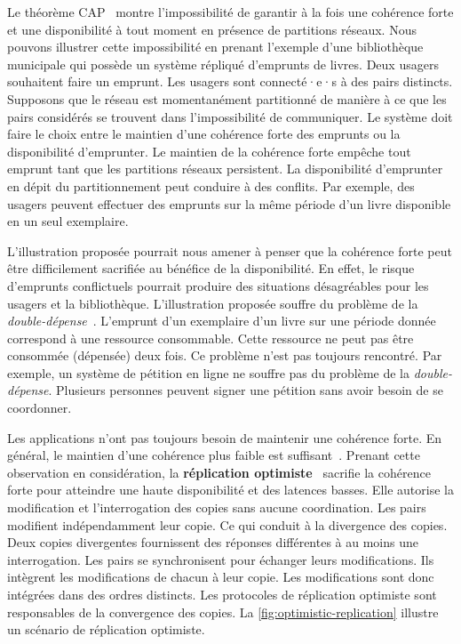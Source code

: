 Le théorème CAP~\cite{brewer_cap_2000,gilbert_cap_2002} montre l'impossibilité de garantir à la fois une cohérence forte et une disponibilité à tout moment en présence de partitions réseaux.
Nous pouvons illustrer cette impossibilité en prenant l'exemple d'une bibliothèque municipale qui possède un système répliqué d'emprunts de livres.
Deux usagers souhaitent faire un emprunt.
Les usagers sont connecté·e·s à des pairs distincts.
Supposons que le réseau est momentanément partitionné de manière à ce que les pairs considérés se trouvent dans l'impossibilité de communiquer.
Le système doit faire le choix entre le maintien d'une cohérence forte des emprunts ou la disponibilité d'emprunter.
Le maintien de la cohérence forte empêche tout emprunt tant que les partitions réseaux persistent.
La disponibilité d'emprunter en dépit du partitionnement peut conduire à des conflits.
Par exemple, des usagers peuvent effectuer des emprunts sur la même période d'un livre disponible en un seul exemplaire.

L'illustration proposée pourrait nous amener à penser que la cohérence forte peut être difficilement sacrifiée au bénéfice de la disponibilité.
En effet, le risque d'emprunts conflictuels pourrait produire des situations désagréables pour les usagers et la bibliothèque.
L'illustration proposée souffre du problème de la \emph{double-dépense}~\cite{chohan_doublespending_2017}.
L'emprunt d'un exemplaire d'un livre sur une période donnée correspond à une ressource consommable.
Cette ressource ne peut pas être consommée (dépensée) deux fois.
Ce problème n'est pas toujours rencontré.
Par exemple, un système de pétition en ligne ne souffre pas du problème de la \emph{double-dépense}.
Plusieurs personnes peuvent signer une pétition sans avoir besoin de se coordonner.

Les applications n'ont pas toujours besoin de maintenir une cohérence forte.
En général, le maintien d'une cohérence plus faible est suffisant~\autocite{terry_baseball_2013, hellerstein_calm_2019, decandia_dynamo_2007}.
Prenant cette observation en considération, la \textbf{réplication optimiste}~\autocite{saito_2005_optimisticreplication} sacrifie la cohérence forte pour atteindre une haute disponibilité et des latences basses.
Elle autorise la modification et l'interrogation des copies sans aucune coordination.
Les pairs modifient indépendamment leur copie.
Ce qui conduit à la divergence des copies.
Deux copies divergentes fournissent des réponses différentes à au moins une interrogation.
Les pairs se synchronisent pour échanger leurs modifications.
Ils intègrent les modifications de chacun à leur copie.
Les modifications sont donc intégrées dans des ordres distincts.
Les protocoles de réplication optimiste sont responsables de la convergence des copies.
La \autoref{fig:optimistic-replication} illustre un scénario de réplication optimiste.

